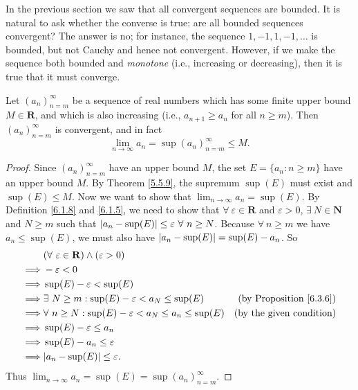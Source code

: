 \begin{note}
In the previous section we saw that all convergent sequences are bounded.
It is natural to ask whether the converse is true:
are all bounded sequences convergent?
The answer is no;
for instance, the sequence \(1, -1, 1, -1, \dots\) is bounded, but not Cauchy and hence not convergent.
However, if we make the sequence both bounded and \emph{monotone} (i.e., increasing or decreasing), then it is true that it must converge.
\end{note}

\begin{proposition}\label{6.3.8}
Let \((a_n)_{n = m}^\infty\) be a sequence of real numbers which has some finite upper bound \(M \in \mathbf{R}\), and which is also increasing (i.e., \(a_{n + 1} \geq a_n\) for all \(n \geq m\)).
Then \((a_n)_{n = m}^\infty\) is convergent, and in fact
\[
    \lim_{n \to \infty} a_n = \sup(a_n)_{n = m}^\infty \leq M.
\]
\end{proposition}

\begin{proof}
Since \((a_n)_{n = m}^\infty\) have an upper bound \(M\), the set \(E = \{a_n : n \geq m\}\) have an upper bound \(M\).
By Theorem \ref{5.5.9}, the supremum \(\sup(E)\) must exist and \(\sup(E) \leq M\).
Now we want to show that \(\lim_{n \to \infty} a_n = \sup(E)\).
By Definition \ref{6.1.8} and \ref{6.1.5}, we need to show that \(\forall\ \varepsilon \in \mathbf{R}\) and \(\varepsilon > 0\), \(\exists\ N \in \mathbf{N}\) and \(N \geq m\) such that \(\abs*{a_n - \sup(E)} \leq \varepsilon \ \forall\ n \geq N\).
Because \(\forall\ n \geq m\) we have \(a_n \leq \sup(E)\), we must also have \(\abs*{a_n - \sup(E)} = \sup(E) - a_n\).
So
\begin{align*}
& (\forall\ \varepsilon \in \mathbf{R}) \land (\varepsilon > 0) \\
\implies & -\varepsilon < 0 \\
\implies & \sup(E) - \varepsilon < \sup(E) \\
\implies & \exists\ N \geq m : \sup(E) - \varepsilon < a_N \leq \sup(E) & \text{(by Proposition \ref{6.3.6})} \\
\implies & \forall\ n \geq N : \sup(E) - \varepsilon < a_N \leq a_n \leq \sup(E) & \text{(by the given condition)} \\
\implies & \sup(E) - \varepsilon \leq a_n \\
\implies & \sup(E) - a_n \leq \varepsilon \\
\implies & \abs*{a_n - \sup(E)} \leq \varepsilon.
\end{align*}
Thus \(\lim_{n \to \infty} a_n = \sup(E) = \sup(a_n)_{n = m}^\infty\).
\end{proof}

